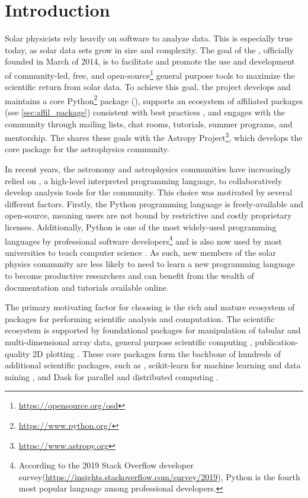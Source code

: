 \section{Introduction}
\label{sec:intro}

Solar physicists rely heavily on software to analyze data. This is especially true today, as solar data sets grow in size and complexity.
The goal of the \sunpyproj, officially founded in March of 2014, is to facilitate and promote the use and development of community-led, free, and open-source\footnote{\url{https://opensource.org/osd}} general purpose tools to maximize the scientific return from solar data. 
To achieve this goal, the project develops and maintains a core Python\footnote{\url{https://www.python.org/}} package (\sunpypkg), supports an ecosystem of affiliated packages (see \autoref{sec:affil_package}) consistent with best practices \citep{Wilson:2014cka}, and engages with the community through mailing lists, chat rooms, tutorials, summer programs, and mentorship. The \sunpyproj shares these goals with the Astropy Project\footnote{\url{https://www.astropy.org}}, which develops the \astropypkg core package \citep{astropy2018} for the astrophysics community.

In recent years, the astronomy and astrophysics communities have increasingly relied on \python, a high-level interpreted  programming language, to collaboratively develop analysis tools for the community.
This choice was motivated by several different factors.
Firstly, the Python programming language is freely-available and open-source, meaning users are not bound by restrictive and costly proprietary licenses.
Additionally, Python is one of the most widely-used programming languages by professional software developers\footnote{According to the 2019 Stack Overflow developer survey(\url{https://insights.stackoverflow.com/survey/2019}), Python is the fourth most popular language among professional developers.} and is also now used by most universities to teach computer science \citep{guo2014}.
As such, new members of the solar physics community are less likely to need to learn a new programming language to become productive researchers and can benefit from the wealth of \python documentation and tutorials available online.

The primary motivating factor for choosing \python is the rich and mature ecosystem of packages for performing scientific analysis and computation. 
The scientific \python ecosystem is supported by foundational packages for manipulation of tabular \citep[\pandas,][]{pandas} and multi-dimensional array\citep[\numpy,][]{numpy} data, general purpose scientific computing \citep[\scipy,][]{scipy}, publication-quality 2D plotting \citep[\matplotlib,][]{matplotlib}. 
These core packages form the backbone of hundreds of additional scientific \python packages, such as \astropypkg, scikit-learn for machine learning and data mining \citep{pedregosa11}, and Dask for parallel and distributed computing \citep{rocklin15}.

